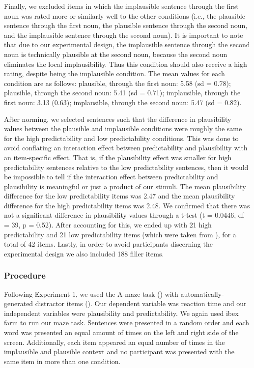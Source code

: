 \documentclass[
  12pt,
  letterpaper,
]{scrreprt}
\begin{document}
Finally, we excluded items in which the implausible sentence through the
first noun was rated more or similarly well to the other conditions
(i.e., the plausible sentence through the first noun, the plausible
sentence through the second noun, and the implausible sentence through
the second noun). It is important to note that due to our experimental
design, the implausible sentence through the second noun is technically
plausible at the second noun, because the second noun eliminates the
local implausibility. Thus this condition should also receive a high
rating, despite being the implausible condition. The mean values for
each condition are as follows: plausible, through the first noun: 5.58
(sd = 0.78); plausible, through the second noun: 5.41 (sd = 0.71);
implausible, through the first noun: 3.13 (0.63); implausible, through
the second noun: 5.47 (sd = 0.82).

After norming, we selected sentences such that the difference in
plausibility values between the plausible and implausible conditions
were roughly the same for the high predictability and low predictability
conditions. This was done to avoid conflating an interaction effect
between predictability and plausibility with an item-specific effect.
That is, if the plausibility effect was smaller for high predictability
sentences relative to the low predictability sentences, then it would be
impossible to tell if the interaction effect between predictability and
plausibility is meaningful or just a product of our stimuli. The mean
plausibility difference for the low predictability items was 2.47 and
the mean plausibility difference for the high predictability items was
2.48. We confirmed that there was not a significant difference in
plausibility values through a t-test (t = 0.0446, df = 39, p = 0.52).
After accounting for this, we ended up with 21 high predictability and
21 low predictability items (which were taken from
), for
a total of 42 items. Lastly, in order to avoid participants discerning
the experimental design we also included 188 filler items.

\subsubsection{Procedure}\label{procedure-1}

Following Experiment 1, we used the A-maze task
() with
automatically-generated distractor items
(). Our dependent variable was reaction time and our independent
variables were plausibility and predictability. We again used ibex farm
to run our maze task. Sentences were presented in a random order and
each word was presented an equal amount of times on the left and right
side of the screen. Additionally, each item appeared an equal number of
times in the implausible and plausible context and no participant was
presented with the same item in more than one condition.
\end{document}
